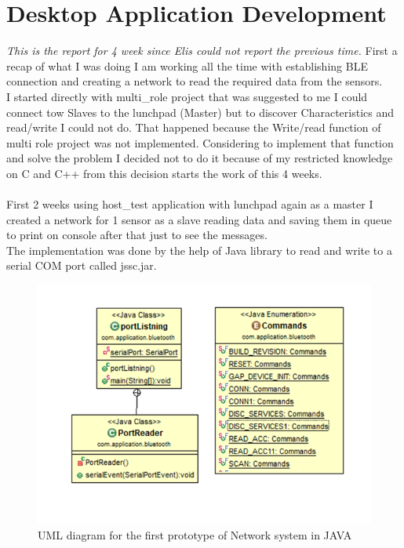 \documentclass[conference,12pt]{IEEETran}
\begin{document}
\section{Desktop Application Development}\cite{vendor}\cite{devguide}\cite{userguide}
\textit{This is the report for 4 week since Elis could not report the previous time.}
First a recap of what I was doing I am working all the time with establishing BLE  connection and creating a network to read the required data from the sensors.\\
I started directly with multi\_role project that was suggested to me I could connect tow Slaves to the lunchpad (Master) but to discover Characteristics and read/write I could not do. That happened because the Write/read function of multi role project was not implemented. Considering to implement that function and solve the problem I decided not to do it because of my restricted knowledge on C and C++ from this decision starts the work of this 4 weeks.\\\\
First 2 weeks using host\_test application with lunchpad again as a master I created a network for 1 sensor as a slave reading data and saving them in queue to print on console after that just to see the messages.\\
The implementation was done by the help of Java library to read and write to a serial COM port called jssc.jar.\\
\begin{figure}[!h]
	\centering
	\includegraphics[scale=0.50]{images/UML1.png}
	\caption{UML diagram for the first prototype of Network system in JAVA}
	\label{img:UML1}
\end{figure}
\end{document}
